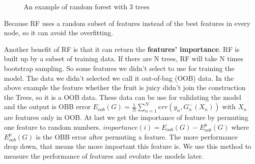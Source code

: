 \begin{figure}[!h]
  \caption{An example of random forest with 3 trees}
\label{fig:randomforest}
\end{figure}


Because RF uses a random subset of features instead of the best features in every node, so it can avoid the overfitting\cite{breiman2001random}. 

Another benefit of RF is that it can return the \textbf{features' importance}. RF is built up by a subset of training data. If there are N trees, RF will take N times bootstrap sampling. So some features we didn't select to use for training the model. The data we didn't selected we call it out-of-bag (OOB) data. In the above example the feature whether the fruit is juicy didn't join the construction the Trees, so it is a OOB data. These data can be use for validating the model and the output is OBB error $E_{oob}(G) = \frac {1}{N} \sum_{n=1}^{N}err(y_n,G_{n}^-(X_n))$ with $X_n$ are features only in OOB. At last we get the importance of feature by permuting one feature to random numbers. $importance(i)= E_{oob}(G)-E_{oob}^{p}(G)$ where $E_{oob}^{p}(G)$ is the OBB error after permuting a feature. The more performance drop down, that means the more important this feature is. We use this method to measure the performance of features and evolute the models later.

